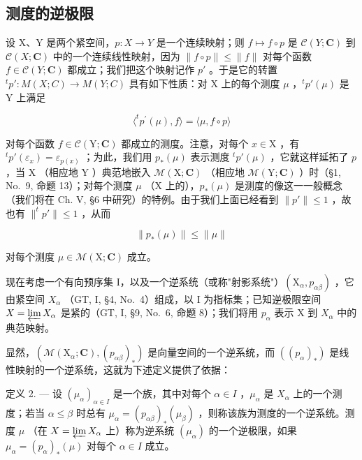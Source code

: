 \subsection{测度的逆极限}

设 X、Y 是两个紧空间，\(p : X \to Y\) 是一个连续映射；则 \(f \mapsto f \circ p\) 是 \(\mathcal{C}(Y; \mathbf{C})\) 到 \(\mathcal{C}(X; \mathbf{C})\) 中的一个连续线性映射，因为 \(\|f \circ p\| \leqslant \|f\|\) 对每个函数 \(f \in \mathcal{C}(Y; \mathbf{C})\) 都成立；我们把这个映射记作 \(p'\) 。于是它的转置 \(^{t}p' : M(X; C) \to M(Y; C)\) 具有如下性质：对 X 上的每个测度 \(\mu\) ，\(^{t}p'(\mu)\) 是 Y 上满足

\[
\langle^ {t} p ^ {\prime} (\mu), f \rangle = \langle \mu , f \circ p \rangle
\]

对每个函数 \(f \in \mathcal{C}(\mathrm{Y};\mathbf{C})\) 都成立的测度。注意，对每个 \(x \in \mathrm{X}\) ，有 \(^t p'(\varepsilon_x) = \varepsilon_{p(x)}\) ；为此，我们用 \(p_*(\mu)\) 表示测度 \(^t p'(\mu)\) ，它就这样延拓了 \(p\) ，当 \(\mathrm{X}\) （相应地 \(\mathrm{Y}\) ）典范地嵌入 \(\mathcal{M}(\mathrm{X};\mathbf{C})\) （相应地 \(\mathcal{M}(\mathrm{Y};\mathbf{C})\) ）时（§1, No.~9, 命题 13）；对每个测度 \(\mu\) （\(\mathrm{X}\) 上的），\(p_*(\mu)\) 是测度的像这一一般概念（我们将在 Ch. V, §6 中研究）的特例。由于我们上面已经看到 \(\| p' \| \leqslant 1\) ，故也有 \(\| ^t p' \| \leqslant 1\) ，从而

\[
\| p _ {*} (\mu) \| \leqslant \| \mu \|\tag{15}
\]

对每个测度 \(\mu \in \mathcal{M}(\mathrm{X};\mathbf{C})\) 成立。

现在考虑一个有向预序集 I，以及一个逆系统（或称"射影系统"）\((\mathrm{X}_{\alpha}, p_{\alpha\beta})\) ，它由紧空间 \(X_{\alpha}\) （GT, I, §4, No.~4）组成，以 I 为指标集；已知逆极限空间 \(X = \varprojlim X_{\alpha}\) 是紧的（GT, I, §9, No.~6, 命题 8）；我们将用 \(p_{\alpha}\) 表示 X 到 \(X_{\alpha}\) 中的典范映射。

显然，\((\mathcal{M}(\mathrm{X}_{\alpha};\mathbf{C}),(p_{\alpha\beta})_{*})\) 是向量空间的一个逆系统，而 \(((p_{\alpha})_{*})\) 是线性映射的一个逆系统，这就为下述定义提供了依据：

定义 2. --- 设 \((\mu_{\alpha})_{\alpha \in I}\) 是一个族，其中对每个 \(\alpha \in I\) ，\(\mu_{\alpha}\) 是 \(X_{\alpha}\) 上的一个测度；若当 \(\alpha \leqslant \beta\) 时总有 \(\mu_{\alpha} = (p_{\alpha \beta})_{*}(\mu_{\beta})\) ，则称该族为测度的一个逆系统。测度 \(\mu\) （在 \(X = \varprojlim X_{\alpha}\) 上）称为逆系统 \((\mu_{\alpha})\) 的一个逆极限，如果 \(\mu_{\alpha} = (p_{\alpha})_{*}(\mu)\) 对每个 \(\alpha \in I\) 成立。

